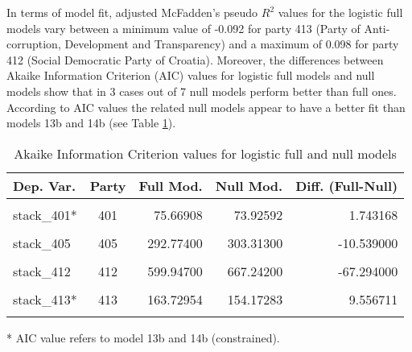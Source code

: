 \documentclass[
]{article}
\begin{document}
In terms of model fit, adjusted McFadden's pseudo \(R^2\) values for the logistic full models vary between
a minimum value of
-0.092
for party 413
(Party of Anti-corruption, Development and Transparency)
and a maximum of
0.098
for party 412
(Social Democratic Party of Croatia).
Moreover, the differences between Akaike Information Criterion (AIC) values for logistic full models and
null models show that in 3 cases out of 7 null models perform better than full ones. According to AIC
values the related null models appear to have a better fit than models 13b and 14b (see Table
\ref{table:logit_aic_hr}).

\begin{table}[!h]

\caption{\label{tab:unnamed-chunk-34}Akaike Information Criterion values for logistic full and null models 
        \label{table:logit_aic_hr}}
\centering
\begin{threeparttable}
\begin{tabular}[t]{lcrrr}
\toprule
Dep. Var. & Party & Full Mod. & Null Mod. & Diff. (Full-Null)\\
\midrule
\cellcolor{gray!6}{stack\_401} & \cellcolor{gray!6}{401} & \cellcolor{gray!6}{76.29500} & \cellcolor{gray!6}{73.92600} & \cellcolor{gray!6}{2.369000}\\
stack\_401* & 401 & 75.66908 & 73.92592 & 1.743168\\
\cellcolor{gray!6}{stack\_404} & \cellcolor{gray!6}{404} & \cellcolor{gray!6}{406.63000} & \cellcolor{gray!6}{425.29500} & \cellcolor{gray!6}{-18.665000}\\
stack\_405 & 405 & 292.77400 & 303.31300 & -10.539000\\
\cellcolor{gray!6}{stack\_406} & \cellcolor{gray!6}{406} & \cellcolor{gray!6}{193.08600} & \cellcolor{gray!6}{185.68300} & \cellcolor{gray!6}{7.403000}\\
\addlinespace
stack\_412 & 412 & 599.94700 & 667.24200 & -67.294000\\
\cellcolor{gray!6}{stack\_413} & \cellcolor{gray!6}{413} & \cellcolor{gray!6}{166.12800} & \cellcolor{gray!6}{154.17300} & \cellcolor{gray!6}{11.955000}\\
stack\_413* & 413 & 163.72954 & 154.17283 & 9.556711\\
\cellcolor{gray!6}{stack\_414} & \cellcolor{gray!6}{414} & \cellcolor{gray!6}{481.70400} & \cellcolor{gray!6}{472.07800} & \cellcolor{gray!6}{9.626000}\\
\bottomrule
\end{tabular}
\begin{tablenotes}[para]
\item[*] AIC value refers to model 13b and 14b (constrained).
\end{tablenotes}
\end{threeparttable}
\end{table}
\end{document}

